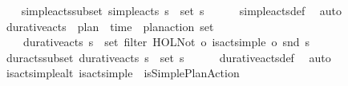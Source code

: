 \begin{isabellebody}
\isanewline
\ \ \isamarkupfalse%
\ simple{\isacharunderscore}{\kern0pt}acts{\isacharunderscore}{\kern0pt}subset{\isacharcolon}{\kern0pt}\ {\isachardoublequoteopen}simple{\isacharunderscore}{\kern0pt}acts\ {\isasympi}s\ {\isasymsubseteq}\ set\ {\isasympi}s{\isachardoublequoteclose}\isanewline
%
\isadelimproof
\ \ \ \ %
\endisadelimproof
%
\isatagproof
{}\isamarkupfalse%
\ simple{\isacharunderscore}{\kern0pt}acts{\isacharunderscore}{\kern0pt}def\ \isamarkupfalse%
\ auto%
\endisatagproof
{\isafoldproof}%
%
\isadelimproof
\isanewline
%
\endisadelimproof
\isanewline
\ \ \isamarkupfalse%
\ durative{\isacharunderscore}{\kern0pt}acts\ {\isacharcolon}{\kern0pt}{\isacharcolon}{\kern0pt}\ {\isachardoublequoteopen}plan\ {\isasymRightarrow}\ {\isacharparenleft}{\kern0pt}time\ {\isasymtimes}\ plan{\isacharunderscore}{\kern0pt}action{\isacharparenright}{\kern0pt}\ set{\isachardoublequoteclose}\ \ \isanewline
\ \ \ \ {\isachardoublequoteopen}durative{\isacharunderscore}{\kern0pt}acts\ {\isasympi}s\ {\isacharequal}{\kern0pt}\ set\ {\isacharparenleft}{\kern0pt}filter\ {\isacharparenleft}{\kern0pt}{\isacharparenleft}{\kern0pt}HOL{\isachardot}{\kern0pt}Not{\isacharparenright}{\kern0pt}\ o\ is{\isacharunderscore}{\kern0pt}act{\isacharunderscore}{\kern0pt}simple\ o\ snd{\isacharparenright}{\kern0pt}\ {\isasympi}s{\isacharparenright}{\kern0pt}{\isachardoublequoteclose}\isanewline
\isanewline
\ \ \isamarkupfalse%
\ dur{\isacharunderscore}{\kern0pt}acts{\isacharunderscore}{\kern0pt}subset{\isacharcolon}{\kern0pt}\ {\isachardoublequoteopen}durative{\isacharunderscore}{\kern0pt}acts\ {\isasympi}s\ {\isasymsubseteq}\ set\ {\isasympi}s{\isachardoublequoteclose}\isanewline
%
\isadelimproof
\ \ \ \ %
\endisadelimproof
%
\isatagproof
{}\isamarkupfalse%
\ durative{\isacharunderscore}{\kern0pt}acts{\isacharunderscore}{\kern0pt}def\ \isamarkupfalse%
\ auto%
\endisatagproof
{\isafoldproof}%
%
\isadelimproof
\isanewline
%
\endisadelimproof
\isanewline
\ \ \isamarkupfalse%
\ is{\isacharunderscore}{\kern0pt}act{\isacharunderscore}{\kern0pt}simple{\isacharunderscore}{\kern0pt}alt{\isacharcolon}{\kern0pt}\ {\isachardoublequoteopen}is{\isacharunderscore}{\kern0pt}act{\isacharunderscore}{\kern0pt}simple\ {\isacharequal}{\kern0pt}\ is{\isacharunderscore}{\kern0pt}Simple{\isacharunderscore}{\kern0pt}Plan{\isacharunderscore}{\kern0pt}Action{\isachardoublequoteclose}\isanewline
%
\isadelimproof
\ \ \ \ %
\endisadelimproof

\end{isabellebody}
